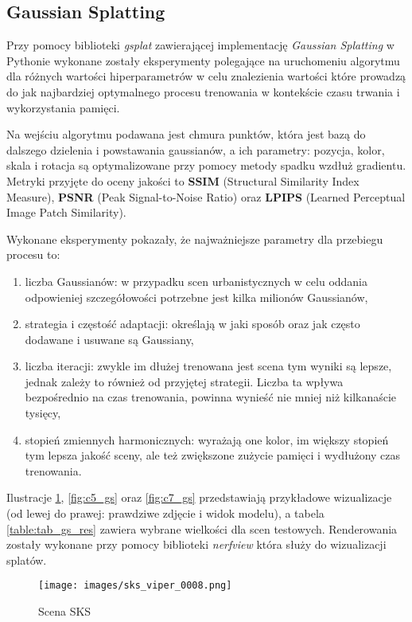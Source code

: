 \subsection{Gaussian Splatting}
Przy pomocy biblioteki \textit{gsplat}\cite{ye2024gsplatopensourcelibrarygaussian} zawierającej implementację \textit{Gaussian Splatting} w Pythonie wykonane zostały eksperymenty polegające na uruchomeniu algorytmu dla różnych wartości hiperparametrów w celu znalezienia wartości które prowadzą do jak najbardziej optymalnego procesu trenowania w kontekście czasu trwania i wykorzystania pamięci. 

Na wejściu algorytmu podawana jest chmura punktów, która jest bazą do dalszego dzielenia i powstawania gaussianów, a ich parametry: pozycja, kolor, skala i rotacja są optymalizowane przy pomocy metody spadku wzdłuż gradientu. Metryki przyjęte do oceny jakości to \textbf{SSIM} (Structural Similarity Index Measure), \textbf{PSNR} (Peak Signal-to-Noise Ratio) oraz \textbf{LPIPS} (Learned Perceptual Image Patch Similarity).

Wykonane eksperymenty pokazały, że najważniejsze parametry dla przebiegu procesu to: 
\begin{enumerate}
    \item liczba Gaussianów: w przypadku scen urbanistycznych w celu oddania odpowieniej szczegółowości potrzebne jest kilka milionów Gaussianów,
    \item strategia i częstość adaptacji: określają w jaki sposób oraz jak często dodawane i usuwane są Gaussiany, 
    \item liczba iteracji: zwykle im dłużej trenowana jest scena tym wyniki są lepsze, jednak zależy to również od przyjętej strategii. Liczba ta wpływa bezpośrednio na czas trenowania, powinna wynieść nie mniej niż kilkanaście tysięcy,
    \item stopień zmiennych harmonicznych: wyrażają one kolor, im większy stopień tym lepsza jakość sceny, ale też zwiększone zużycie pamięci i wydłużony czas trenowania. 
\end{enumerate}

Ilustracje \ref{fig:sks_gs}, \ref{fig:c5_gs} oraz \ref{fig:c7_gs} przedstawiają przykładowe wizualizacje (od lewej do prawej: prawdziwe zdjęcie i widok modelu), a tabela \ref{table:tab_gs_res} zawiera wybrane wielkości dla scen testowych. Renderowania zostały wykonane przy pomocy biblioteki \textit{nerfview} która służy do wizualizacji splatów.

\begin{figure}[!h]
    \centering
    \texttt{[image: images/sks\_viper\_0008.png]}
    \caption{Scena SKS}
    \label{fig:sks_gs}
\end{figure}

